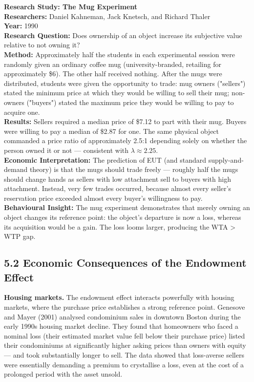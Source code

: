 \documentclass[12pt, letterpaper]{article}
\begin{document}
\begin{researchbox}
\textbf{Research Study: The Mug Experiment}\\[4pt]

\textbf{Researchers:} Daniel Kahneman, Jack Knetsch, and Richard Thaler\\[4pt]
\textbf{Year:} 1990\\[4pt]
\textbf{Research Question:} Does ownership of an object increase its subjective value relative to not owning it?\\[4pt]
\textbf{Method:} Approximately half the students in each experimental session were randomly given an ordinary coffee mug (university-branded, retailing for approximately \$6). The other half received nothing. After the mugs were distributed, students were given the opportunity to trade: mug owners ("sellers") stated the minimum price at which they would be willing to sell their mug; non-owners ("buyers") stated the maximum price they would be willing to pay to acquire one.\\[4pt]
\textbf{Results:} Sellers required a median price of \$7.12 to part with their mug. Buyers were willing to pay a median of \$2.87 for one. The same physical object commanded a price ratio of approximately 2.5:1 depending solely on whether the person owned it or not --- consistent with $\lambda \approx 2.25$.\\[4pt]
\textbf{Economic Interpretation:} The prediction of EUT (and standard supply-and-demand theory) is that the mugs should trade freely --- roughly half the mugs should change hands as sellers with low attachment sell to buyers with high attachment. Instead, very few trades occurred, because almost every seller's reservation price exceeded almost every buyer's willingness to pay.\\[4pt]
\textbf{Behavioural Insight:} The mug experiment demonstrates that merely owning an object changes its reference point: the object's departure is now a loss, whereas its acquisition would be a gain. The loss looms larger, producing the WTA > WTP gap.\\[4pt]
\end{researchbox}


\subsection{5.2 Economic Consequences of the Endowment Effect}


\textbf{Housing markets.} The endowment effect interacts powerfully with housing markets, where the purchase price establishes a strong reference point. Genesove and Mayer (2001) analysed condominium sales in downtown Boston during the early 1990s housing market decline. They found that homeowners who faced a nominal loss (their estimated market value fell below their purchase price) listed their condominiums at significantly higher asking prices than owners with equity --- and took substantially longer to sell. The data showed that loss-averse sellers were essentially demanding a premium to crystallise a loss, even at the cost of a prolonged period with the asset unsold.
\end{document}
